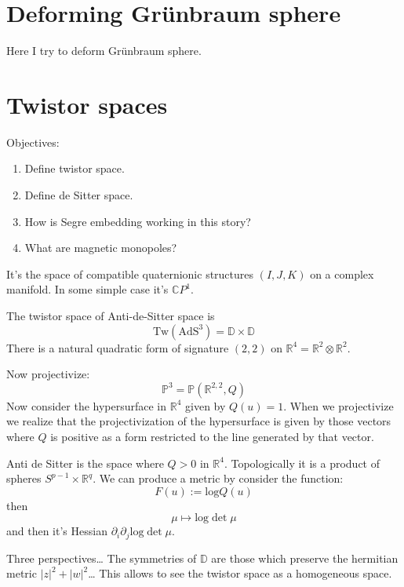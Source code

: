 \section{Deforming Grünbraum sphere}
\label{section-grunbaum-sphere}

Here I try to deform Grünbraum sphere.

\section{Twistor spaces}
\label{section-twistor-spaces}

Objectives:
\begin{enumerate}
\item Define twistor space.
\item Define de Sitter space.
\item How is Segre embedding working in this story?
\item What are magnetic monopoles?
\end{enumerate}

\begin{definition}
\label{definition-twistor-space}
It's the space of compatible quaternionic structures $(I,J,K)$ on a complex
manifold. In some simple case it's $\mathbb{C}P^{1}$.
\end{definition}

The twistor space of Anti-de-Sitter space is
$$
\text{Tw}(\text{AdS}^3)=\mathbb{D}\times \mathbb{D}
$$
There is a natural quadratic form of signature $(2,2)$ on
$\mathbb{R}^4=\mathbb{R}^2 \otimes \mathbb{R}^2$. 

Now projectivize:
$$
\mathbb{P}^3=\mathbb{P}(\mathbb{R}^{2,2},Q)
$$
Now consider the hypersurface in $\mathbb{R}^4$ given by $Q(u)=1$. When we
projectivize we realize that the projectivization of the hypersurface is given
by those vectors where $Q$ is positive as a form restricted to the line
generated by that vector.

Anti de Sitter is the space where $Q>0$ in $\mathbb{R}^4$. Topologically it is a
product of spheres $S^{p-1}\times \mathbb{R}^q$. We can produce a metric by
consider the function:
$$
F(u):=\text{log}Q(u)
$$
then
$$
\mu \mapsto  \text{log}\det\mu
$$
and then it's Hessian $\partial_i \partial_j \text{log}\det \mu$.

Three perspectives… The symmetries of $\mathbb{D}$ are those which preserve the
 hermitian metric $|z|^2+|w|^2$… This allows to see the twistor space
 as a homogeneous space.

